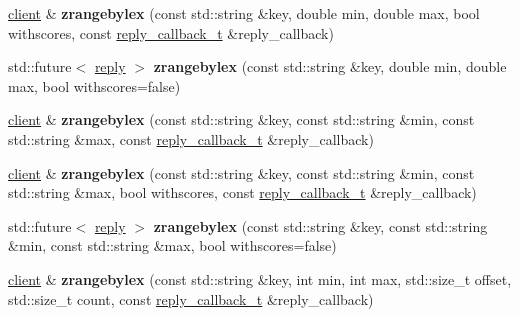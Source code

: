 \begin{DoxyCompactItemize}
\mbox{\hyperlink{classcpp__redis_1_1client}{client}} \& {\bfseries zrangebylex} (const std\+::string \&key, double min, double max, bool withscores, const \mbox{\hyperlink{classcpp__redis_1_1client_af7a65eb21aa25230bfbb0b0203c4fc04}{reply\+\_\+callback\+\_\+t}} \&reply\+\_\+callback)
\item 
\mbox{\label{classcpp__redis_1_1client_a20fb39dc31f4ee0df01c9c843c45572a}} 
std\+::future$<$ \mbox{\hyperlink{classcpp__redis_1_1reply}{reply}} $>$ {\bfseries zrangebylex} (const std\+::string \&key, double min, double max, bool withscores=false)
\item 
\mbox{\label{classcpp__redis_1_1client_a14f5483239d01088f296539c414b2984}} 
\mbox{\hyperlink{classcpp__redis_1_1client}{client}} \& {\bfseries zrangebylex} (const std\+::string \&key, const std\+::string \&min, const std\+::string \&max, const \mbox{\hyperlink{classcpp__redis_1_1client_af7a65eb21aa25230bfbb0b0203c4fc04}{reply\+\_\+callback\+\_\+t}} \&reply\+\_\+callback)
\item 
\mbox{\label{classcpp__redis_1_1client_a8f299507d616c9a468a2dfedd7a572e6}} 
\mbox{\hyperlink{classcpp__redis_1_1client}{client}} \& {\bfseries zrangebylex} (const std\+::string \&key, const std\+::string \&min, const std\+::string \&max, bool withscores, const \mbox{\hyperlink{classcpp__redis_1_1client_af7a65eb21aa25230bfbb0b0203c4fc04}{reply\+\_\+callback\+\_\+t}} \&reply\+\_\+callback)
\item 
\mbox{\label{classcpp__redis_1_1client_a8b49805661f4f73adc595258d68bc1f7}} 
std\+::future$<$ \mbox{\hyperlink{classcpp__redis_1_1reply}{reply}} $>$ {\bfseries zrangebylex} (const std\+::string \&key, const std\+::string \&min, const std\+::string \&max, bool withscores=false)
\item 
\mbox{\label{classcpp__redis_1_1client_a285a489ec6cc3863d38e4e6ba8c2a537}} 
\mbox{\hyperlink{classcpp__redis_1_1client}{client}} \& {\bfseries zrangebylex} (const std\+::string \&key, int min, int max, std\+::size\+\_\+t offset, std\+::size\+\_\+t count, const \mbox{\hyperlink{classcpp__redis_1_1client_af7a65eb21aa25230bfbb0b0203c4fc04}{reply\+\_\+callback\+\_\+t}} \&reply\+\_\+callback)
\item 

\end{DoxyCompactItemize}
